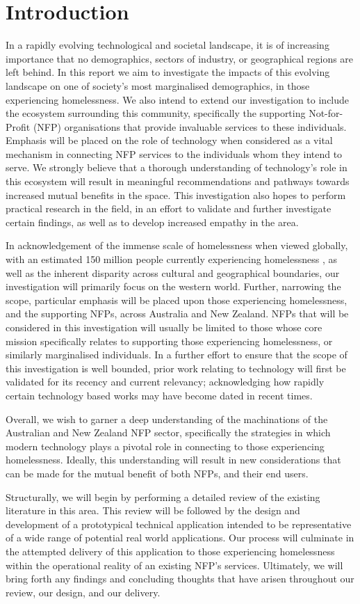 \chapter{Introduction}

In a rapidly evolving technological and societal landscape, it is of increasing importance that no demographics, sectors of industry, or geographical regions are left behind. In this report we aim to investigate the impacts of this evolving landscape on one of society's most marginalised demographics, in those experiencing homelessness. We also intend to extend our investigation to include the ecosystem surrounding this community, specifically the supporting Not-for-Profit (NFP) organisations that provide invaluable services to these individuals. Emphasis will be placed on the role of technology when considered as a vital mechanism in connecting NFP services to the individuals whom they intend to serve. We strongly believe that a thorough understanding of technology's role in this ecosystem will result in meaningful recommendations and pathways towards increased mutual benefits in the space. This investigation also hopes to perform practical research in the field, in an effort to validate and further investigate certain findings, as well as to develop increased empathy in the area.

In acknowledgement of the immense scale of homelessness when viewed globally, with an estimated 150 million people currently experiencing homelessness \cite{chamie_2017}, as well as the inherent disparity across cultural and geographical boundaries, our investigation will primarily focus on the western world. Further, narrowing the scope, particular emphasis will be placed upon those experiencing homelessness, and the supporting NFPs, across Australia and New Zealand. NFPs that will be considered in this investigation will usually be limited to those whose core mission specifically relates to supporting those experiencing homelessness, or similarly marginalised individuals. In a further effort to ensure that the scope of this investigation is well bounded, prior work relating to technology will first be validated for its recency and current relevancy; acknowledging how rapidly certain technology based works may have become dated in recent times.

Overall, we wish to garner a deep understanding of the machinations of the Australian and New Zealand NFP sector, specifically the strategies in which modern technology plays a pivotal role in connecting to those experiencing homelessness. Ideally, this understanding will result in new considerations that can be made for the mutual benefit of both NFPs, and their end users.

Structurally, we will begin by performing a detailed review of the existing literature in this area. This review will be followed by the design and development of a prototypical technical application intended to be representative of a wide range of potential real world applications. Our process will culminate in the attempted delivery of this application to those experiencing homelessness within the operational reality of an existing NFP's services. Ultimately, we will bring forth any findings and concluding thoughts that have arisen throughout our review, our design, and our delivery.